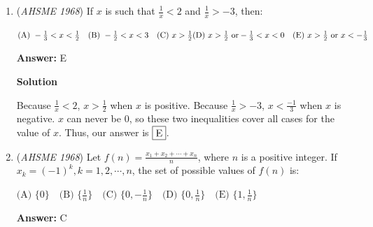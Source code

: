 \begin{enumerate}
\textbf{Solution}

Product $P$ can be written as $2n-1$,$2n+1$,$2n+3$. Because $P$ is defined as a "3 consecutive odd integer" product impies that $P$ must be divisible by at least 3. A is ruled out because factors of 5 only arise every 5 terms, if we were to take the 3 terms in the middle of the factors of 5 we wouldn't have a factor of 5. Obviously B is impossible because we are multiplying odd numbers and 2 would never become one of our prime factors. C is ruled out with the same logic as A. Lastly E is ruled out because we have already proved that 3 is possible, and the question asks for greatest possible.$\fbox{D}$

            \begin{itemize}
        \item In first step we could also apply modular arthmetic and get the same answer.
            \end{itemize}
            


	\item (\textit{AHSME 1968}) If $x$ is such that $\frac{1}{x}<2$ and $\frac{1}{x}>-3$, then:


 $\text{(A) } -\frac{1}{3}<x<\frac{1}{2}\quad \text{(B) } -\frac{1}{2}<x<3\quad \text{(C) } x>\frac{1}{2}\quad\\ \text{(D) } x>\frac{1}{2} \text{ or} -\frac{1}{3}<x<0\quad \text{(E) } x>\frac{1}{2} \text{ or } x<-\frac{1}{3}$

 \textbf{Answer: }E



\textbf{Solution}

Because $\frac{1}{x}<2$, $x>\frac{1}{2}$ when $x$ is positive. Because $\frac{1}{x}>-3$, $x<\frac{-1}{3}$ when $x$ is negative. $x$ can never be $0$, so these two inequalities cover all cases for the value of $x$. Thus, our answer is $\fbox{E}$.

 


	\item (\textit{AHSME 1968}) Let $f(n)=\frac{x_1+x_2+\cdots +x_n}{n}$, where $n$ is a positive integer. If $x_k=(-1)^k, k=1,2,\cdots ,n$, the set of possible values of $f(n)$ is:


 $\text{(A) } \{0\}\quad \text{(B) } \{\frac{1}{n}\}\quad \text{(C) } \{0,-\frac{1}{n}\}\quad \text{(D) } \{0,\frac{1}{n}\}\quad \text{(E) } \{1,\frac{1}{n}\}$

 \textbf{Answer: }C




\end{enumerate}
